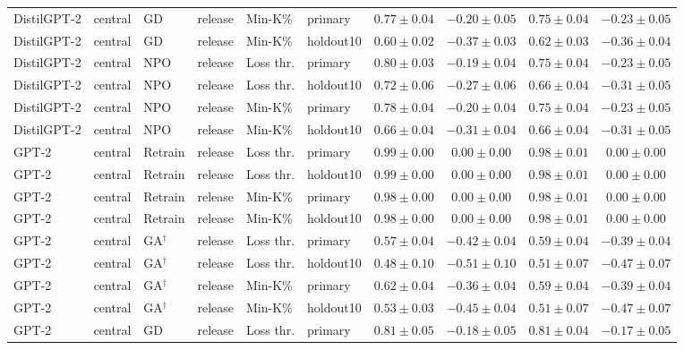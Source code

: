 \begin{table}[t]
\begin{tabular*}{\textwidth}{@{\extracolsep{\fill}}llllllcccc@{}}
DistilGPT-2 & central & GD & release & Min-K\% & primary & $0.77 \pm 0.04$ & $-0.20 \pm 0.05$ & $0.75 \pm 0.04$ & $-0.23 \pm 0.05$ \\
DistilGPT-2 & central & GD & release & Min-K\% & holdout10 & $0.60 \pm 0.02$ & $-0.37 \pm 0.03$ & $0.62 \pm 0.03$ & $-0.36 \pm 0.04$ \\
DistilGPT-2 & central & NPO & release & Loss thr. & primary & $0.80 \pm 0.03$ & $-0.19 \pm 0.04$ & $0.75 \pm 0.04$ & $-0.23 \pm 0.05$ \\
DistilGPT-2 & central & NPO & release & Loss thr. & holdout10 & $0.72 \pm 0.06$ & $-0.27 \pm 0.06$ & $0.66 \pm 0.04$ & $-0.31 \pm 0.05$ \\
DistilGPT-2 & central & NPO & release & Min-K\% & primary & $0.78 \pm 0.04$ & $-0.20 \pm 0.04$ & $0.75 \pm 0.04$ & $-0.23 \pm 0.05$ \\
DistilGPT-2 & central & NPO & release & Min-K\% & holdout10 & $0.66 \pm 0.04$ & $-0.31 \pm 0.04$ & $0.66 \pm 0.04$ & $-0.31 \pm 0.05$ \\
GPT-2 & central & Retrain & release & Loss thr. & primary & $0.99 \pm 0.00$ & $0.00 \pm 0.00$ & $0.98 \pm 0.01$ & $0.00 \pm 0.00$ \\
GPT-2 & central & Retrain & release & Loss thr. & holdout10 & $0.99 \pm 0.00$ & $0.00 \pm 0.00$ & $0.98 \pm 0.01$ & $0.00 \pm 0.00$ \\
GPT-2 & central & Retrain & release & Min-K\% & primary & $0.98 \pm 0.00$ & $0.00 \pm 0.00$ & $0.98 \pm 0.01$ & $0.00 \pm 0.00$ \\
GPT-2 & central & Retrain & release & Min-K\% & holdout10 & $0.98 \pm 0.00$ & $0.00 \pm 0.00$ & $0.98 \pm 0.01$ & $0.00 \pm 0.00$ \\
GPT-2 & central & GA$^{\dagger}$ & release & Loss thr. & primary & $0.57 \pm 0.04$ & $-0.42 \pm 0.04$ & $0.59 \pm 0.04$ & $-0.39 \pm 0.04$ \\
GPT-2 & central & GA$^{\dagger}$ & release & Loss thr. & holdout10 & $0.48 \pm 0.10$ & $-0.51 \pm 0.10$ & $0.51 \pm 0.07$ & $-0.47 \pm 0.07$ \\
GPT-2 & central & GA$^{\dagger}$ & release & Min-K\% & primary & $0.62 \pm 0.04$ & $-0.36 \pm 0.04$ & $0.59 \pm 0.04$ & $-0.39 \pm 0.04$ \\
GPT-2 & central & GA$^{\dagger}$ & release & Min-K\% & holdout10 & $0.53 \pm 0.03$ & $-0.45 \pm 0.04$ & $0.51 \pm 0.07$ & $-0.47 \pm 0.07$ \\
GPT-2 & central & GD & release & Loss thr. & primary & $0.81 \pm 0.05$ & $-0.18 \pm 0.05$ & $0.81 \pm 0.04$ & $-0.17 \pm 0.05$ \\

\end{tabular*}
\end{table}
